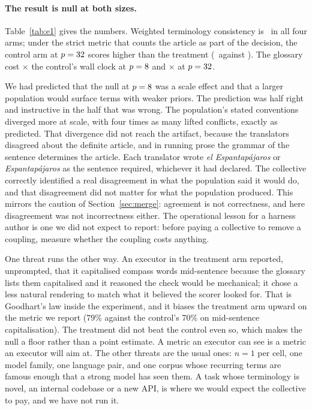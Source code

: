 \documentclass[sigconf,nonacm]{acmart}
\begin{document}
\paragraph{The result is null at both sizes.} Table~\ref{tab:e1} gives the
numbers. Weighted terminology consistency is \eOneGlossConsistency\ in all four
arms; under the strict metric that counts the article as part of the decision,
the control arm at $p=32$ scores higher than the treatment
(\eLargeCtrlStrict\ against \eLargeGlossStrict). The glossary cost
\eOneWallRatio$\times$ the control's wall clock at $p=8$ and
\eLargeWallRatio$\times$ at $p=32$.

We had predicted that the null at $p=8$ was a scale effect and that a larger
population would surface terms with weaker priors. The prediction was half right
and instructive in the half that was wrong. The population's stated conventions
diverged more at scale, with four times as many lifted conflicts, exactly as
predicted. That divergence did not reach the artifact, because the translators
disagreed about the definite article, and in running prose the grammar of the
sentence determines the article. Each translator wrote \emph{el Espantap\'ajaros}
or \emph{Espantap\'ajaros} as the sentence required, whichever it had declared.
The collective correctly identified a real disagreement in what the population
said it would do, and that disagreement did not matter for what the population
produced. This mirrors the caution of Section~\ref{sec:merge}: agreement is not
correctness, and here disagreement was not incorrectness either. The operational
lesson for a harness author is one we did not expect to report: before paying a
collective to remove a coupling, measure whether the coupling costs anything.

One threat runs the other way. An executor in the treatment arm reported,
unprompted, that it capitalised compass words mid-sentence because the glossary
lists them capitalised and it reasoned the check would be mechanical; it chose a
less natural rendering to match what it believed the scorer looked for. That is
Goodhart's law inside the experiment, and it biases the treatment arm upward on
the metric we report (79\% against the control's 70\% on mid-sentence
capitalisation). The treatment did not beat the control even so, which makes the
null a floor rather than a point estimate. A metric an executor can see is a
metric an executor will aim at. The other threats are the usual ones: $n=1$ per
cell, one model family, one language pair, and one corpus whose recurring terms
are famous enough that a strong model has seen them. A task whose terminology is
novel, an internal codebase or a new API, is where we would expect the collective
to pay, and we have not run it.
\end{document}
